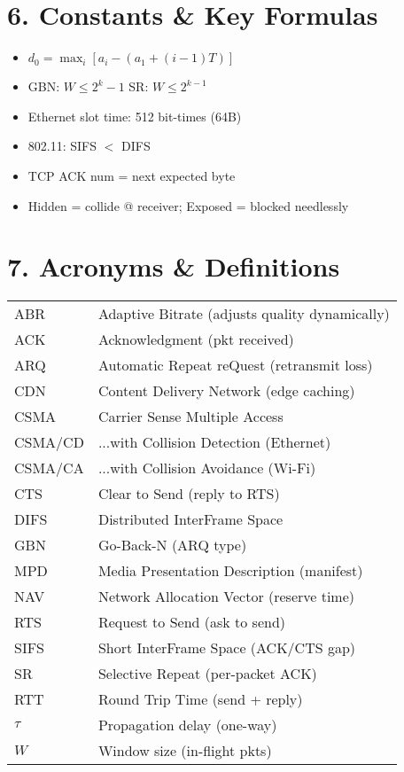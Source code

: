 \documentclass[10pt]{article}
\begin{document}
\begin{multicols*}{2}
\section*{6. Constants \& Key Formulas}
\begin{itemize}\itemsep0pt
\item $d_0 = \max_i [a_i - (a_1 + (i-1)T)]$
\item GBN: $W \le 2^k - 1$ \quad SR: $W \le 2^{k-1}$
\item Ethernet slot time: 512 bit-times (64B)
\item 802.11: SIFS $<$ DIFS
\item TCP ACK num = next expected byte
\item Hidden = collide @ receiver; Exposed = blocked needlessly
\end{itemize}

\section*{7. Acronyms \& Definitions}
\begin{tabular}{@{}p{1.2cm}p{3.5cm}@{}}
ABR & Adaptive Bitrate (adjusts quality dynamically)\\
ACK & Acknowledgment (pkt received)\\
ARQ & Automatic Repeat reQuest (retransmit loss)\\
CDN & Content Delivery Network (edge caching)\\
CSMA & Carrier Sense Multiple Access\\
CSMA/CD & ...with Collision Detection (Ethernet)\\
CSMA/CA & ...with Collision Avoidance (Wi-Fi)\\
CTS & Clear to Send (reply to RTS)\\
DIFS & Distributed InterFrame Space\\
GBN & Go-Back-N (ARQ type)\\
MPD & Media Presentation Description (manifest)\\
NAV & Network Allocation Vector (reserve time)\\
RTS & Request to Send (ask to send)\\
SIFS & Short InterFrame Space (ACK/CTS gap)\\
SR & Selective Repeat (per-packet ACK)\\
RTT & Round Trip Time (send + reply)\\
$\tau$ & Propagation delay (one-way)\\
$W$ & Window size (in-flight pkts)\\
\end{tabular}


\end{multicols*}
\end{document}

